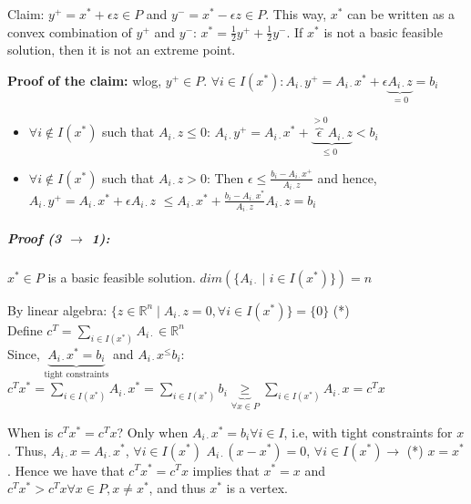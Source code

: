 \documentclass[main]{subfiles}
\begin{document}
Claim: $y^{+} = x^{*} + \epsilon z \in P$ and $y^{-} = x^{*} - \epsilon z \in 
P$. This way, $x^*$ can be written as a convex combination of $y^+$ and $y^-$:
$x^{*} = \frac{1}{2}y^{+} + \frac{1}{2}y^{-}$.
If $x^*$ is not a basic feasible solution, then it is not an extreme point.

\textbf{Proof of the claim:} wlog, $y^{+} \in P$. $\forall i \in I(x^{*}):
A_{i\cdot} y^{+} = A_{i\cdot}x^{*} + \epsilon
\underbrace{A_{i\cdot} z}_\text{$=0$} = b_{i}$

\begin{itemize}
\item $\forall i \notin I(x^{*})$ such that $ A_{i\cdot}z \leq 0$:
$A_{i\cdot} y^{+} = A_{i\cdot}x^{*} + \underbrace{\overbrace{\epsilon}
^{\text{$>0$}} A_{i\cdot} z}_{\text{$\leq 0$ }} < b_{i}$
\item $\forall i \notin I(x^{*})$ such that $ A_{i\cdot}z > 0$:
Then $\epsilon \leq \frac{b_{i} - A_{i\cdot}x^{+}}{A_{i\cdot}z}$ and hence,
$A_{i\cdot}y^{+} = A_{i\cdot}x^{*} + \epsilon A_{i\cdot}z$
$\leq A_{i\cdot}x^{*} + \frac{b_{i} - A_{i\cdot} x^{*}}{A_{i\cdot}z} A_{i\cdot}
z = b_{i}$
\end{itemize}


\subparagraph{Proof (3 $\rightarrow$ 1):} $x^{*} \in P$ is a basic feasible
solution. $dim(\{A_{i\cdot} \mid i \in I(x^{*})\}) = n$

By linear algebra: $\{z \in \mathbb{R}^{n} \mid A_{i\cdot}z = 0, \forall i \in
I(x^{*})\} = \{0\}$ (*) \\

Define $c^{T} = \sum_{i \in I(x^{*})}^{} A_{i\cdot} \in \mathbb{R}^{n}$ \\
Since, $\underbrace{A_{i\cdot}x^{*} = b_i}_{\text{tight constraints}}$ and
$A_{i\cdot}x^ \leq b_i$: \\

$c^{T}x^{*} =  \sum_{i \in I(x^{*})}^{} A_{i\cdot}x^{*} = \sum_{i \in
I(x^{*})}^{} b_{i} \underbrace{\geq}_{\forall x \in P} \sum_{i \in I(x^{*})}
A_{i\cdot}x = c^{T}x$

When is $c^{T}x^{*} = c^{T}x$? Only when $A_{i\cdot} x^{*} = b_i \forall i \in
I$, i.e, with tight constraints for $x$. Thus, $A_{i\cdot}x = A_{i\cdot}x^{*}$,
$\forall i \in I(x^{*})$
$A_{i\cdot}(x - x^{*}) = 0$, $\forall i \in I(x^{*}) \rightarrow$ (*) $x =
x^{*}$.
Hence we have that $c^{T}x^* = c^{T}x$ implies that $x^*=x$ and $c^{T}x^* >
c^{T}x \forall x \in P, x \neq x^*$, and thus $x^*$ is a vertex.
\end{document}
